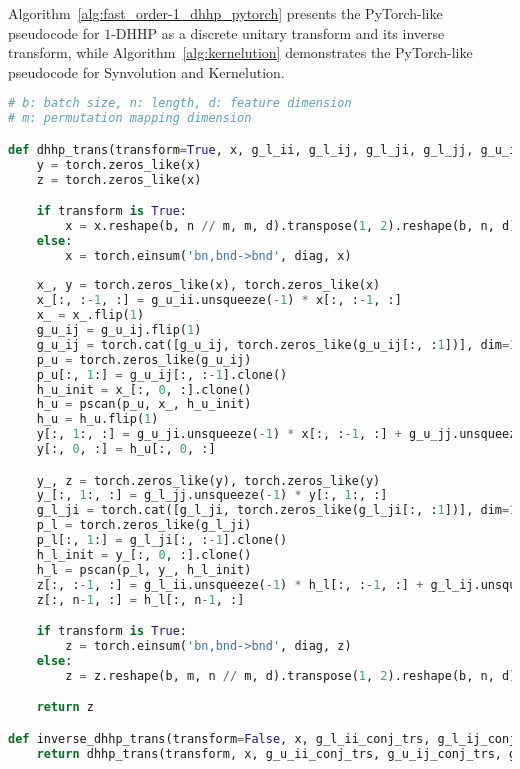 Algorithm~\ref{alg:fast_order-1_dhhp_pytorch} presents the PyTorch-like pseudocode for $1$-DHHP as a discrete unitary transform and its inverse transform, while Algorithm~\ref{alg:kernelution} demonstrates the PyTorch-like pseudocode for Synvolution and Kernelution.

\begin{algorithm}[!h]
\caption{PyTorch-like pseudocode for $1$-DHHP as a discrete unitary transform and its inverse transform.}
\label{alg:fast_order-1_dhhp_pytorch}
\begin{lstlisting}[language=python]
# b: batch size, n: length, d: feature dimension
# m: permutation mapping dimension

def dhhp_trans(transform=True, x, g_l_ii, g_l_ij, g_l_ji, g_l_jj, g_u_ii, g_u_ij, g_u_ji, g_u_jj, diag):
    y = torch.zeros_like(x)
    z = torch.zeros_like(x)

    if transform is True:
        x = x.reshape(b, n // m, m, d).transpose(1, 2).reshape(b, n, d)
    else:
        x = torch.einsum('bn,bnd->bnd', diag, x)
    
    x_, y = torch.zeros_like(x), torch.zeros_like(x)
    x_[:, :-1, :] = g_u_ii.unsqueeze(-1) * x[:, :-1, :]
    x_ = x_.flip(1)
    g_u_ij = g_u_ij.flip(1)
    g_u_ij = torch.cat([g_u_ij, torch.zeros_like(g_u_ij[:, :1])], dim=1)
    p_u = torch.zeros_like(g_u_ij)
    p_u[:, 1:] = g_u_ij[:, :-1].clone()
    h_u_init = x_[:, 0, :].clone()
    h_u = pscan(p_u, x_, h_u_init)
    h_u = h_u.flip(1)
    y[:, 1:, :] = g_u_ji.unsqueeze(-1) * x[:, :-1, :] + g_u_jj.unsqueeze(-1) * h_u[:, 1:, :]
    y[:, 0, :] = h_u[:, 0, :]

    y_, z = torch.zeros_like(y), torch.zeros_like(y)
    y_[:, 1:, :] = g_l_jj.unsqueeze(-1) * y[:, 1:, :]
    g_l_ji = torch.cat([g_l_ji, torch.zeros_like(g_l_ji[:, :1])], dim=1)
    p_l = torch.zeros_like(g_l_ji)
    p_l[:, 1:] = g_l_ji[:, :-1].clone()
    h_l_init = y_[:, 0, :].clone()
    h_l = pscan(p_l, y_, h_l_init)
    z[:, :-1, :] = g_l_ii.unsqueeze(-1) * h_l[:, :-1, :] + g_l_ij.unsqueeze(-1) * y[:, 1:, :]
    z[:, n-1, :] = h_l[:, n-1, :]

    if transform is True:
        z = torch.einsum('bn,bnd->bnd', diag, z)
    else:
        z = z.reshape(b, m, n // m, d).transpose(1, 2).reshape(b, n, d)

    return z

def inverse_dhhp_trans(transform=False, x, g_l_ii_conj_trs, g_l_ij_conj_trs, g_l_ji_conj_trs, g_l_jj_conj_trs, g_u_ii_conj_trs, g_u_ij_conj_trs, g_u_ji_conj_trs, g_u_jj_conj_trs, diag_conj_trs):
    return dhhp_trans(transform, x, g_u_ii_conj_trs, g_u_ij_conj_trs, g_u_ji_conj_trs, g_u_jj_conj_trs, g_l_ii_conj_trs, g_l_ij_conj_trs, g_l_ji_conj_trs, g_l_jj_conj_trs, diag_conj_trs)
\end{lstlisting}
\end{algorithm}

